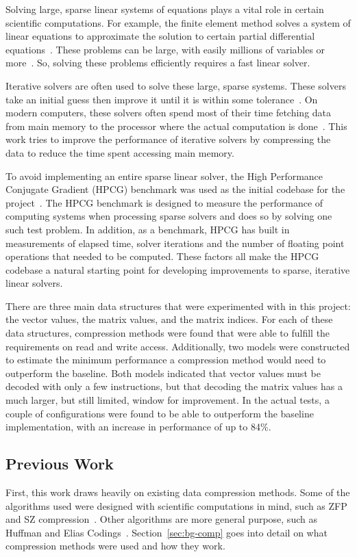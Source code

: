 Solving large, sparse linear systems of equations plays a vital role in certain scientific computations.
For example, the finite element method solves a system of linear equations to approximate the solution to certain partial differential equations~\cite{Saad:2003:IterativeMethods}.
These problems can be large, with easily millions of variables or more~\cite{Davis:2011:FloridaMatrixCollection}.
So, solving these problems efficiently requires a fast linear solver.

Iterative solvers are often used to solve these large, sparse systems.
These solvers take an initial guess then improve it until it is within some tolerance~\cite{Saad:2003:IterativeMethods}.
On modern computers, these solvers often spend most of their time fetching data from main memory to the processor where the actual computation is done~\cite{Lawlor:2013:compression}.
This work tries to improve the performance of iterative solvers by compressing the data to reduce the time spent accessing main memory.

To avoid implementing an entire sparse linear solver, the High Performance Conjugate Gradient (HPCG) benchmark was used as the initial codebase for the project~\cite{Dongarra:2015:HPCG}.
The HPCG benchmark is designed to measure the performance of computing systems when processing sparse solvers and does so by solving one such test problem.
In addition, as a benchmark, HPCG has built in measurements of elapsed time, solver iterations and the number of floating point operations that needed to be computed.
These factors all make the HPCG codebase a natural starting point for developing improvements to sparse, iterative linear solvers.

There are three main data structures that were experimented with in this project: the vector values, the matrix values, and the matrix indices.
For each of these data structures, compression methods were found that were able to fulfill the requirements on read and write access.
Additionally, two models were constructed to estimate the minimum performance a compression method would need to outperform the baseline.
Both models indicated that vector values must be decoded with only a few instructions, but that decoding the matrix values has a much larger, but still limited, window for improvement.
In the actual tests, a couple of configurations were found to be able to outperform the baseline implementation, with an increase in performance of up to 84\%.

\subsection{Previous Work}
First, this work draws heavily on existing data compression methods.
Some of the algorithms used were designed with scientific computations in mind, such as ZFP and SZ compression~\cite{Lindstrom:2014:zfp,Di:2016:SZ}.
Other algorithms are more general purpose, such as Huffman and Elias Codings~\cite{Huffman:1952:coding,Elias:1975:codeword}.
Section~\ref{sec:bg-comp} goes into detail on what compression methods were used and how they work.

